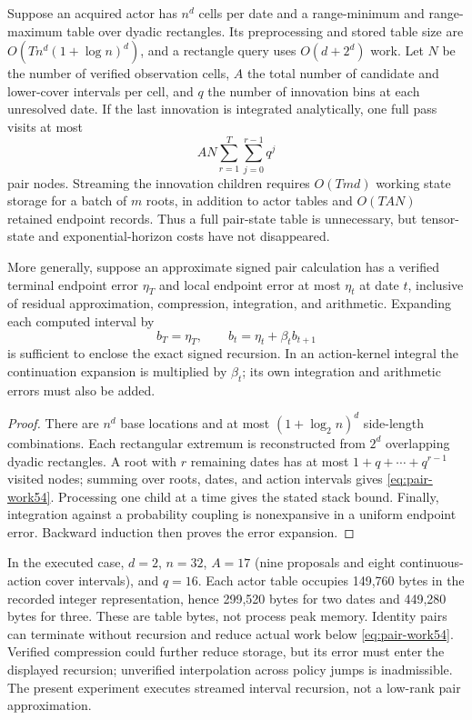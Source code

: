 \begin{proposition}\label{prop:complexity54}
Suppose an acquired actor has $n^d$ cells per date and a range-minimum and range-maximum table over dyadic rectangles. Its preprocessing and stored table size are $O(Tn^d(1+\log n)^d)$, and a rectangle query uses $O(d+2^d)$ work. Let $N$ be the number of verified observation cells, $A$ the total number of candidate and lower-cover intervals per cell, and $q$ the number of innovation bins at each unresolved date. If the last innovation is integrated analytically, one full pass visits at most
\begin{equation}\label{eq:pair-work54}
 AN\sum_{r=1}^{T}\sum_{j=0}^{r-1}q^j
\end{equation}
pair nodes. Streaming the innovation children requires $O(Tmd)$ working state storage for a batch of $m$ roots, in addition to actor tables and $O(TAN)$ retained endpoint records. Thus a full pair-state table is unnecessary, but tensor-state and exponential-horizon costs have not disappeared.

More generally, suppose an approximate signed pair calculation has a verified terminal endpoint error $\eta_T$ and local endpoint error at most $\eta_t$ at date $t$, inclusive of residual approximation, compression, integration, and arithmetic. Expanding each computed interval by
\[
 b_T=\eta_T,\qquad b_t=\eta_t+\beta_tb_{t+1}
\]
is sufficient to enclose the exact signed recursion. In an action-kernel integral the continuation expansion is multiplied by $\beta_t$; its own integration and arithmetic errors must also be added.
\end{proposition}

\begin{proof}
There are $n^d$ base locations and at most $(1+\log_2 n)^d$ side-length combinations. Each rectangular extremum is reconstructed from $2^d$ overlapping dyadic rectangles. A root with $r$ remaining dates has at most $1+q+\cdots+q^{r-1}$ visited nodes; summing over roots, dates, and action intervals gives \eqref{eq:pair-work54}. Processing one child at a time gives the stated stack bound. Finally, integration against a probability coupling is nonexpansive in a uniform endpoint error. Backward induction then proves the error expansion.
\end{proof}

In the executed case, $d=2$, $n=32$, $A=17$ (nine proposals and eight continuous-action cover intervals), and $q=16$. Each actor table occupies 149,760 bytes in the recorded integer representation, hence 299,520 bytes for two dates and 449,280 bytes for three. These are table bytes, not process peak memory. Identity pairs can terminate without recursion and reduce actual work below \eqref{eq:pair-work54}. Verified compression could further reduce storage, but its error must enter the displayed recursion; unverified interpolation across policy jumps is inadmissible. The present experiment executes streamed interval recursion, not a low-rank pair approximation.

